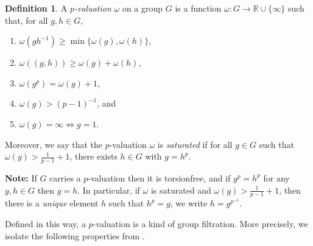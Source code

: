 \documentclass[12pt,a4paper]{article}
\theoremstyle{definition}
\newtheorem{defn}[thm]{Definition}
\theoremstyle{remark}
\theoremstyle{custthm}
\begin{document}
\begin{defn}\label{defn: p-valuation}
\cite[Ch. III, D\'efinition 2.1.2]{Laz65}
A \emph{$p$-valuation} $\omega$ on a group $G$ is a function $\omega: G\to \mathbb{R}\cup\{\infty\}$ such that, for all $g,h\in G$,
\begin{enumerate}[label=(\roman*)]
\item $\omega(gh^{-1}) \geq \min\{\omega(g), \omega(h)\}$,
\item $\omega((g,h)) \geq \omega(g) + \omega(h)$,
\item $\omega(g^p) = \omega(g) + 1$,
\item $\omega(g) > (p-1)^{-1}$, and
\item $\omega(g) = \infty \Leftrightarrow g = 1$.
\end{enumerate}

Moreover, we say that the $p$-valuation $\omega$ is \emph{saturated} if for all $g\in G$ such that $\omega(g)>\frac{1}{p-1}+1$, there exists $h\in G$ with $g=h^p$.
\end{defn}

\textbf{Note:} If $G$ carries a $p$-valuation then it is torsionfree, and if $g^p=h^p$ for any $g,h\in G$ then $g=h$. In particular, if $\omega$ is saturated and $\omega(g)>\frac{1}{p-1}+1$, then there is a \emph{unique} element $h$ such that $h^p=g$, we write $h=g^{p^{-1}}$.

Defined in this way, a $p$-valuation is a kind of group filtration. More precisely, we isolate the following properties from \cite{Laz65}.
\end{document}
